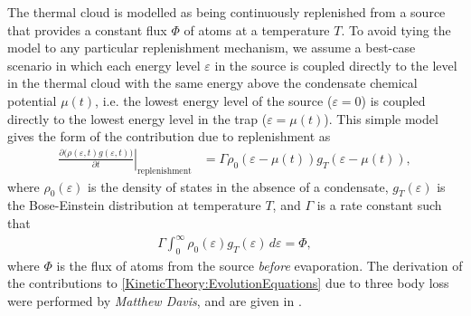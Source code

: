 The thermal cloud is modelled as being continuously replenished from a source that provides a constant flux $\Phi$ of atoms at a temperature $T$.  To avoid tying the model to any particular replenishment mechanism, we assume a best-case scenario in which each energy level $\varepsilon$ in the source is coupled directly to the level in the thermal cloud with the same energy above the condensate chemical potential $\mu(t)$, i.e. the lowest energy level of the source ($\varepsilon=0$) is coupled directly to the lowest energy level in the trap ($\varepsilon = \mu(t)$).  This simple model gives the form of the contribution due to replenishment as
\begin{align}
    \left. \frac{\partial \big(\rho(\varepsilon, t) g(\varepsilon, t))}{\partial t} \right|_\text{replenishment} &= \Gamma \rho_0(\varepsilon - \mu(t)) g_T(\varepsilon - \mu(t)),
    \label{KineticTheory:ReplenishmentProcess}
\end{align}
where $\rho_0(\varepsilon)$ is the density of states in the absence of a condensate, $g_T(\varepsilon)$ is the Bose-Einstein  distribution at temperature $T$, and $\Gamma$ is a rate constant such that
\begin{align}
    \Gamma \int_0^\infty \rho_0(\varepsilon) g_T(\varepsilon)\, d\varepsilon = \Phi,
    \label{KineticTheory:GammaPhiRelation}
\end{align}
where $\Phi$ is the flux of atoms from the source \emph{before} evaporation.  The derivation of the contributions to \eqref{KineticTheory:EvolutionEquations} due to three body loss were performed by \emph{Matthew Davis}, and are given in .

\parasep

